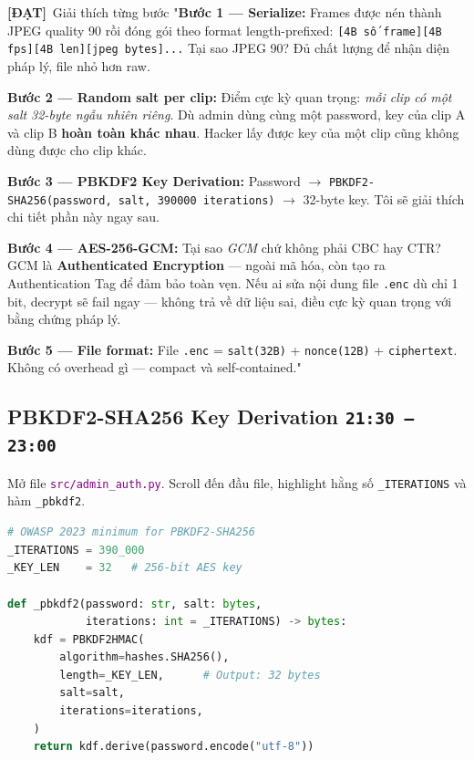 \documentclass[12pt, a4paper]{article}
\newcommand{\timing}[1]{%
  \hfill\colorbox{NavyBlue!20}{\texttt{\small #1}}%
}
\newcommand{\dat}{\textcolor{BrickRed}{\textbf{[ĐẠT]}}}
\newcommand{\fpath}[1]{\texttt{\textcolor{purple}{#1}}}
\begin{document}
\begin{dialog}{\dat\ Giải thích từng bước}
"\textbf{Bước 1 --- Serialize:}
Frames được nén thành JPEG quality 90 rồi đóng gói
theo format length-prefixed: \texttt{[4B số frame][4B fps][4B len][jpeg bytes]...}
Tại sao JPEG 90? Đủ chất lượng để nhận diện pháp lý, file nhỏ hơn raw.

\vspace{0.5em}
\textbf{Bước 2 --- Random salt per clip:}
Điểm cực kỳ quan trọng: \textit{mỗi clip có một salt 32-byte ngẫu nhiên riêng}.
Dù admin dùng cùng một password,
key của clip A và clip B \textbf{hoàn toàn khác nhau}.
Hacker lấy được key của một clip cũng không dùng được cho clip khác.

\vspace{0.5em}
\textbf{Bước 3 --- PBKDF2 Key Derivation:}
Password $\rightarrow$ \texttt{PBKDF2-SHA256(password, salt, 390000 iterations)} $\rightarrow$ 32-byte key.
Tôi sẽ giải thích chi tiết phần này ngay sau.

\vspace{0.5em}
\textbf{Bước 4 --- AES-256-GCM:}
Tại sao \textit{GCM} chứ không phải CBC hay CTR?
GCM là \textbf{Authenticated Encryption} ---
ngoài mã hóa, còn tạo ra Authentication Tag để đảm bảo toàn vẹn.
Nếu ai sửa nội dung file \texttt{.enc} dù chỉ 1 bit,
decrypt sẽ fail ngay --- không trả về dữ liệu sai,
điều cực kỳ quan trọng với bằng chứng pháp lý.

\vspace{0.5em}
\textbf{Bước 5 --- File format:}
File \texttt{.enc} = \texttt{salt(32B)} + \texttt{nonce(12B)} + \texttt{ciphertext}.
Không có overhead gì --- compact và self-contained."
\end{dialog}

\subsection{PBKDF2-SHA256 Key Derivation \timing{21:30 – 23:00}}

\begin{action}
Mở file \fpath{src/admin\_auth.py}. Scroll đến đầu file,
highlight hằng số \texttt{\_ITERATIONS} và hàm \texttt{\_pbkdf2}.
\end{action}

\begin{lstlisting}[language=Python, caption={src/admin\_auth.py --- PBKDF2}]
# OWASP 2023 minimum for PBKDF2-SHA256
_ITERATIONS = 390_000
_KEY_LEN    = 32   # 256-bit AES key

def _pbkdf2(password: str, salt: bytes,
            iterations: int = _ITERATIONS) -> bytes:
    kdf = PBKDF2HMAC(
        algorithm=hashes.SHA256(),
        length=_KEY_LEN,      # Output: 32 bytes
        salt=salt,
        iterations=iterations,
    )
    return kdf.derive(password.encode("utf-8"))
\end{lstlisting}
\end{document}
